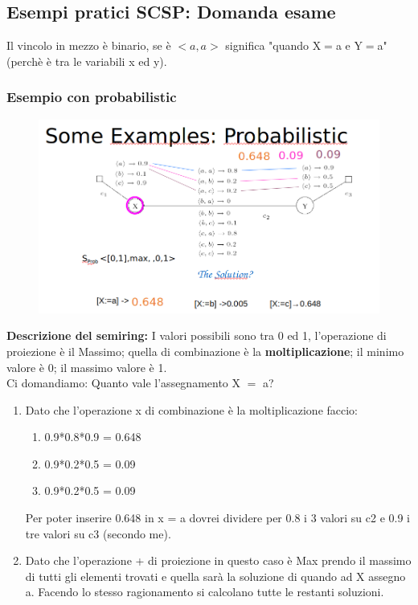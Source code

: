 \subsection{Esempi pratici SCSP: Domanda esame}
Il vincolo in mezzo è binario, se è $< a, a >$ significa "quando X$=$a e Y$=$a" (perchè è tra le variabili x ed y).
\subsubsection{Esempio con probabilistic}
\begin{figure}[htp]
	\centering
    \includegraphics[width=14cm, keepaspectratio]{img/Cap4/probabilistic2.png}
\end{figure}
\noindent \textbf{Descrizione del semiring:} I valori possibili sono tra 0 ed 1, l’operazione
di proiezione è il Massimo; quella di combinazione è la \textbf{moltiplicazione}; il minimo valore è 0; il massimo valore è 1. 
\\Ci domandiamo: Quanto vale l’assegnamento X $=$ a?
\begin{enumerate}
    \item Dato che l’operazione x di combinazione è la moltiplicazione faccio:
    \begin{enumerate}
        \item 0.9*0.8*0.9 = 0.648
        \item 0.9*0.2*0.5 = 0.09
        \item 0.9*0.2*0.5 = 0.09
    \end{enumerate}
    Per poter inserire 0.648 in x = a dovrei dividere per 0.8 i 3 valori su c2 e 0.9 i tre valori su c3 (secondo me).
    \item Dato che l’operazione + di proiezione in questo caso è Max prendo il massimo di tutti gli elementi trovati e quella sarà la soluzione di quando ad X assegno a.
    Facendo lo stesso ragionamento si calcolano tutte le restanti soluzioni.
\end{enumerate}

